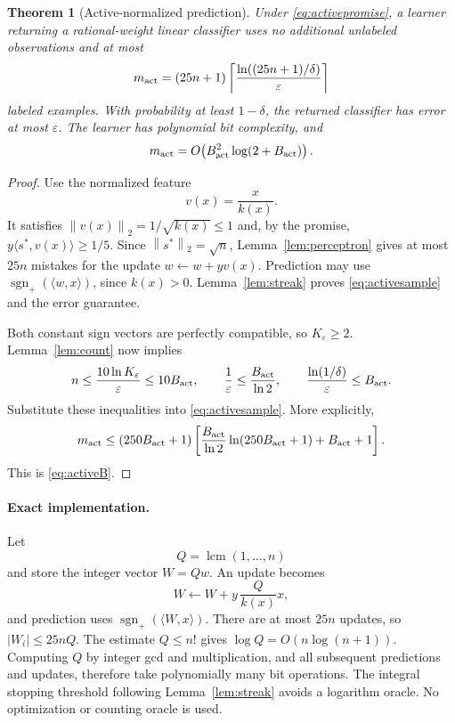 \documentclass[11pt,a4paper]{article}
\newtheorem{theorem}{Theorem}
\theoremstyle{remark}
\newcommand{\sgnplus}{\operatorname{sgn}_{+}}
\newcommand{\norm}[1]{\left\lVert#1\right\rVert}
\newcommand{\ip}[2]{\langle #1,#2\rangle}
\newcommand{\1}{\mathbf 1}
\begin{document}
\begin{theorem}[Active-normalized prediction]\label{thm:active}
Under \eqref{eq:activepromise}, a learner returning a rational-weight linear
classifier uses no additional unlabeled observations and at most
\begin{equation}\label{eq:activesample}
 m_{\rm act}
 =(25n+1)\left\lceil
 \frac{\ln((25n+1)/\delta)}{\varepsilon}\right\rceil
\end{equation}
labeled examples. With probability at least $1-\delta$, the returned classifier
has error at most $\varepsilon$. The learner has polynomial bit complexity, and
\begin{equation}\label{eq:activeB}
 m_{\rm act}=O\!\left(B_{\rm act}^2\log(2+B_{\rm act})\right).
\end{equation}
\end{theorem}
\begin{proof}
Use the normalized feature
\[
 v(x)=\frac{x}{k(x)}.
\]
It satisfies $\norm{v(x)}_2=1/\sqrt{k(x)}\le1$ and, by the promise,
$y\ip{s^*}{v(x)}\ge1/5$. Since $\norm{s^*}_2=\sqrt n$,
Lemma~\ref{lem:perceptron} gives at most $25n$ mistakes for the update
$w\leftarrow w+yv(x)$. Prediction may use
$\sgnplus(\ip{w}{x})$, since $k(x)>0$.
Lemma~\ref{lem:streak} proves \eqref{eq:activesample} and the error guarantee.

Both constant sign vectors are perfectly compatible, so $K_\varepsilon\ge2$.
Lemma~\ref{lem:count} now implies
\[
 n\le\frac{10\ln K_\varepsilon}{\varepsilon}\le10B_{\rm act},
 \qquad
 \frac1\varepsilon\le\frac{B_{\rm act}}{\ln2},
 \qquad
 \frac{\ln(1/\delta)}{\varepsilon}\le B_{\rm act}.
\]
Substitute these inequalities into \eqref{eq:activesample}. More explicitly,
\[
 m_{\rm act}\le
 (250B_{\rm act}+1)
 \left[
 \frac{B_{\rm act}}{\ln2}\ln(250B_{\rm act}+1)
 +B_{\rm act}+1
 \right].
\]
This is \eqref{eq:activeB}.
\end{proof}

\paragraph{Exact implementation.}
Let
\[
 Q=\operatorname{lcm}(1,\ldots,n)
\]
and store the integer vector $W=Qw$. An update becomes
\[
 W\longleftarrow W+y\,\frac{Q}{k(x)}x,
\]
and prediction uses $\sgnplus(\ip{W}{x})$. There are at most $25n$ updates,
so $|W_i|\le25nQ$. The estimate $Q\le n!$ gives
$\log Q=O(n\log(n+1))$. Computing $Q$ by integer gcd and multiplication,
and all subsequent predictions and updates, therefore take polynomially many
bit operations. The integral stopping threshold following
Lemma~\ref{lem:streak} avoids a logarithm oracle. No optimization or counting
oracle is used.
\end{document}
